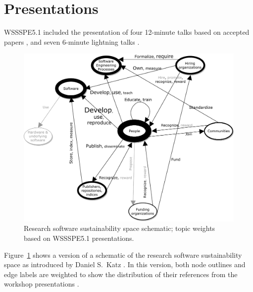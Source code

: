 \documentclass[11pt,letterpaper]{article}
\newcommand{\katznote}[1]{ {\textcolor{magenta}    { ***Dan: #1 }}}
\newcommand{\sdnote}[1]{ {\textcolor{darkgreen}    { ***Stephan: #1 }}}
\begin{document}
\section{Presentations}\label{sec:presentations}


WSSSPE5.1 included the presentation of four 12-minute talks based on accepted papers \cite{nangia_track_2017,haupt_track_2017,queiroz_track_2017,mulholland_track_2017},
and seven 6-minute lightning talks \cite{silva_track_2017,struck_track_2017,washbrook_track_2017,dasler_track_2017,alhozaimy_track_2017,maassen_track_2017,druskat_track_2017}.

\begin{figure}[h!]
  \centering
  \includegraphics[width=\textwidth]{sustainability-schematic-weighted.pdf}
  \caption{Research software sustainability space schematic; topic weights based on WSSSPE5.1 presentations.}
  \label{fig:schematic}
\end{figure}

Figure~\ref{fig:schematic} shows a version of a schematic of the research 
software sustainability space 
as introduced by Daniel S.~Katz \cite{katz_research_2018}.
In this version, both node outlines and edge labels are weighted to show the distribution of
their references from the workshop presentations \cite{druskat_activity}.
\end{document}

